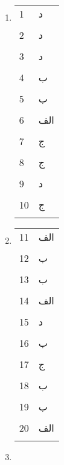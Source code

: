 \documentclass[a4paper,11pt]{article}
\begin{document}
\begin{multicols}{3}
	\begin{enumerate}
	\item []
	\begin{tabular}[c]{||p{1cm}|p{2cm}|}
		\hline
		\hline
		1&د\\ & \\
		\hline
		2&د\\ & \\
		\hline
		3&د\\ & \\
		\hline
		4&ب\\ & \\
		\hline
		5&ب\\ & \\
		\hline
		6&الف\\ & \\
		\hline
		7&ج\\ & \\
		\hline
		8&ج\\ & \\
		\hline
		9&د\\ &  \\
		\hline
		10&ج\\ & \\
		\hline
	\end{tabular}
	\item []
	\begin{tabular}[c]{||p{1cm}|p{2cm}|}
		\hline
		\hline
		11&الف\\ & \\ 
		\hline
		12&ب\\ & \\
		\hline
		13&ب\\ & \\
		\hline
		14&الف\\ & \\
		\hline
		15&د\\ & \\
		\hline
		16&ب\\ & \\
		\hline
		17&ج\\ & \\
		\hline
		18&ب\\ & \\
		\hline
		19&ب\\ & \\
		\hline
		20&الف\\ & \\
		\hline
	\end{tabular}
	\item []

\end{enumerate}
\end{multicols}
\end{document}
